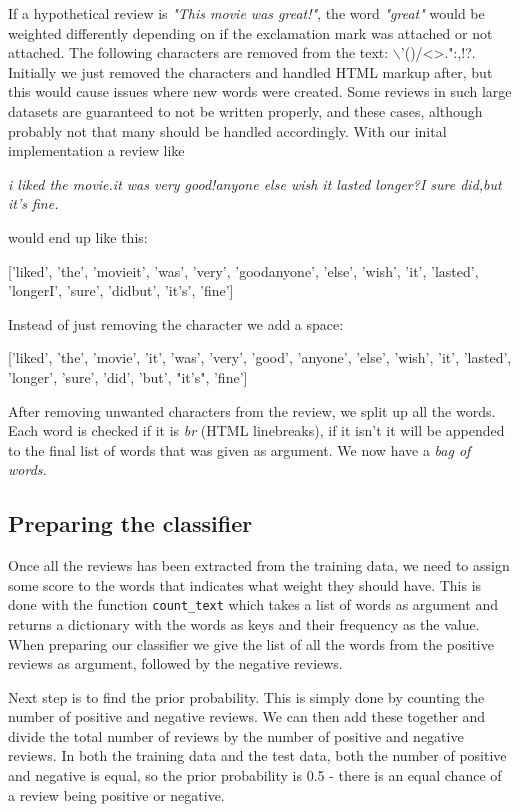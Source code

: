 \documentclass[a4paper,12pt]{article}
\begin{document}
If a hypothetical review is \textit{"This movie was great!"}, the word \textit{"great"} would be weighted differently depending on if the exclamation mark was attached or not attached. The following characters are removed from the text: $\backslash$'()/\textless \textgreater.":,!?. Initially we just removed the characters and handled HTML markup after, but this would cause issues where new words were created. Some reviews in such large datasets are guaranteed to not be written properly, and these cases, although probably not that many should be handled accordingly. With our inital implementation a review like
\begin{center}
    \textit{i liked the movie.it was very good!anyone else wish it lasted longer?I sure did,but it's fine.}
\end{center}
would end up like this:
\begin{center}
['liked', 'the', 'movieit', 'was', 'very', 'goodanyone', 'else', 'wish', 'it', 'lasted', 'longerI', 'sure', 'didbut', 'it's', 'fine']
\end{center}
Instead of just removing the character we add a space:
\begin{center}
['liked', 'the', 'movie', 'it', 'was', 'very', 'good', 'anyone', 'else', 'wish', 'it', 'lasted', 'longer', 'sure', 'did', 'but', "it's", 'fine']
\end{center}
After removing unwanted characters from the review, we split up all the words. Each word is checked if it is \textit{br} (HTML linebreaks), if it isn't it will be appended to the final list of words that was given as argument. We now have a \textit{bag of words.}

\subsection{Preparing the classifier}
Once all the reviews has been extracted from the training data, we need to assign some score to the words that indicates what weight they should have. This is done with the function \texttt{count\_text} which takes a list of words as argument and returns a dictionary with the words as keys and their frequency as the value. When preparing our classifier we give the list of all the words from the positive reviews as argument, followed by the negative reviews. 

Next step is to find the prior probability. This is simply done by counting the number of positive and negative reviews. We can then add these together and divide the total number of reviews by the number of positive and negative reviews. In both the training data and the test data, both the number of positive and negative is equal, so the prior probability is 0.5 - there is an equal chance of a review being positive or negative. 
\end{document}
